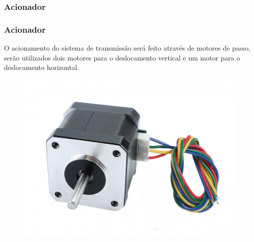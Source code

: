 \subsubsection{Acionador}

\begin{frame}
\frametitle{Acionador}

O acionamento do sistema de transmissão será feito através de motores de passo, serão utilizados dois motores para o deslocamento vertical e um motor para o deslocamento horizontal.  

\begin{figure}
\centering
\includegraphics[scale = 0.1]{figs/motordepassoex}
\end{figure}
    
\end{frame}
